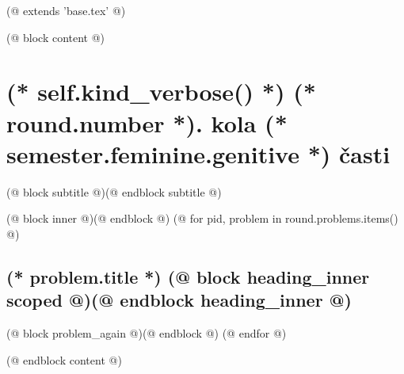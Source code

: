 (@ extends 'base.tex' @)

(@ block content @)
    \thispagestyle{seminar-booklet-first}

    \afterpage{\globaldefs=1\restoregeometry}

    \pagestyle{seminar-booklet-body}


    \section{%
        \texorpdfstring{%
            (* self.kind_verbose() *) (* round.number *). kola (* semester.feminine.genitive *) časti%
        }{%
            (* self.kind_verbose() *)%
        }%
    }
    (@ block subtitle @)(@ endblock subtitle @)

    \setcounter{volume}{(* volume.number *)}
    \setcounter{semester}{(* semester.number *)}
    \setcounter{round}{(* round.number *)}
    \setcounter{section}{(* round.number *)}
    (@ block inner @)(@ endblock @)
    (@ for pid, problem in round.problems.items() @)%
        \setcounter{problem}{(* problem.number *)}%
        \subsection{%
            \texorpdfstring{%
                \large \textbf{(* problem.title *)} \hfill \normalsize%
                (@ block heading_inner scoped @)(@ endblock heading_inner @)}{(* round.number *).(* problem.number *)}%
            \label{(* volume.id *)(* semester.id *)(* round.id *)(* problem.id *)-problem}%
        }%
        (@ block problem_again @)(@ endblock @)
    (@ endfor @)

(@ endblock content @)
